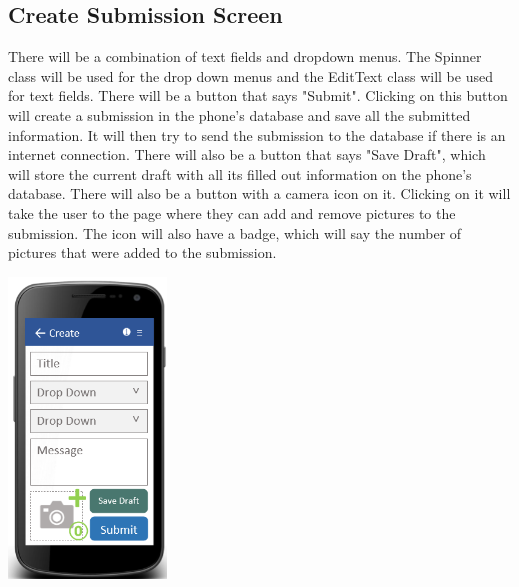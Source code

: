 \documentclass[onecolumn, draftclsnofoot, article, 10pt, compsoc]{IEEEtran}
\begin{document}
\subsection{Create Submission Screen}
There will be a combination of text fields and dropdown menus. The Spinner class will be used for the drop down menus and the EditText class will be used for text fields. There will be a button that says "Submit". Clicking on this button will create a submission in the phone's database and save all the submitted information. It will then try to send the submission to the database if there is an internet connection. There will also be a button that says "Save Draft", which will store the current draft with all its filled out information on the phone's database. There will also be a button with a camera icon on it. Clicking on it will take the user to the page where they can add and remove pictures to the submission. The icon will also have a badge, which will say the number of pictures that were added to the submission.
\newline
\begin{center}
\includegraphics[height=8cm]{createscreen.png}
\end{center}
\end{document}
